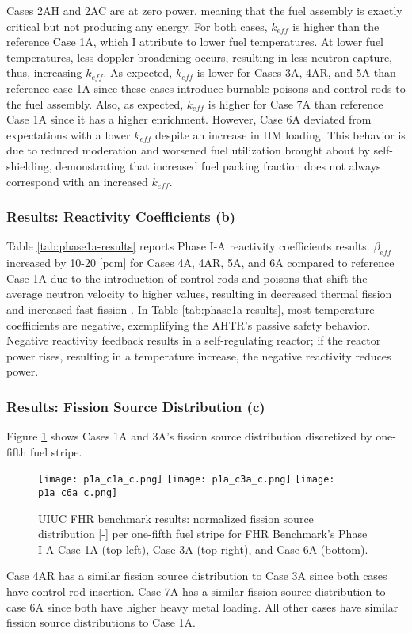 Cases 2AH and 2AC are at zero power, meaning that the fuel assembly is exactly 
critical but not producing any energy. 
For both cases, $k_{eff}$ is higher than the reference Case 1A, which I attribute to 
lower fuel temperatures. 
At lower fuel temperatures, less doppler broadening occurs, resulting in less neutron 
capture, thus, increasing $k_{eff}$. 
As expected, $k_{eff}$ is lower for Cases 3A, 4AR, and 5A than reference case 
1A since these cases introduce burnable poisons and control rods to the fuel 
assembly. 
Also, as expected, $k_{eff}$ is higher for Case 7A than reference Case 1A since 
it has a higher enrichment. 
However, Case 6A deviated from expectations with a lower $k_{eff}$ despite an increase 
in \acrlong{HM} loading. 
This behavior is due to reduced moderation and worsened fuel utilization brought about 
by self-shielding, demonstrating that increased fuel packing fraction does not 
always correspond with an increased $k_{eff}$. 

\subsubsection{Results: Reactivity Coefficients (b)}
Table \ref{tab:phase1a-results} reports Phase I-A reactivity coefficients results. 
$\beta_{eff}$ increased by 10-20 [pcm] for Cases 4A, 4AR, 5A, and 6A compared to
reference Case 1A due to the introduction of control rods and poisons that 
shift the average neutron velocity to higher values, resulting in decreased
thermal fission and increased fast fission \cite{torabi_neutronic_2018}.
In Table \ref{tab:phase1a-results}, most temperature coefficients are negative, 
exemplifying the \gls{AHTR}'s passive safety behavior. 
Negative reactivity feedback results in a self-regulating reactor; if the reactor 
power rises, resulting in a temperature increase, the negative reactivity
reduces power. 

\subsubsection{Results: Fission Source Distribution (c)}
Figure \ref{fig:phase1a-c} shows Cases 1A and 3A's fission source distribution 
discretized by one-fifth fuel stripe. 
\begin{figure}[htbp]
    \centering
    \texttt{[image: p1a\_c1a\_c.png]} 
    \texttt{[image: p1a\_c3a\_c.png]} 
    \texttt{[image: p1a\_c6a\_c.png]} 
    \caption{\gls{UIUC} \gls{FHR} benchmark results: normalized fission source 
    distribution [-] per one-fifth fuel stripe for \acrlong{FHR} Benchmark's Phase I-A 
    Case 1A (top left), Case 3A (top right), and Case 6A (bottom).}
    \label{fig:phase1a-c}
\end{figure}
Case 4AR has a similar fission source distribution to Case 3A since both 
cases have control rod insertion. 
Case 7A has a similar fission source distribution to case 6A since both have 
higher heavy metal loading. 
All other cases have similar fission source distributions to Case 1A. 

